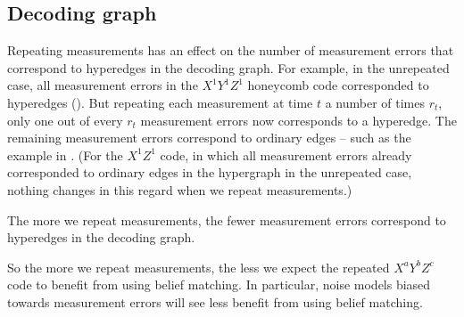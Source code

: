 \subsection{Decoding graph}\label{subsec:repeating_measurements_decoding_graph}

Repeating measurements has an effect on the number of measurement errors that correspond to hyperedges in the decoding graph.
For example, in the unrepeated case, all measurement errors in the $X^1 Y^1 Z^1$ honeycomb code corresponded to hyperedges ().
But repeating each measurement at time $t$ a number of times $r_t$,
only one out of every $r_t$ measurement errors now corresponds to a hyperedge.
The remaining measurement errors correspond to ordinary edges -- such as the example in .
(For the $X^1 Z^1$ code, in which all measurement errors already corresponded to ordinary edges in the hypergraph in the unrepeated case,
nothing changes in this regard when we repeat measurements.)

\begin{difference}\label{dif:repeated_meas_errors_hyperedges}
The more we repeat measurements, the fewer measurement errors correspond to hyperedges in the decoding graph.
\end{difference}

So the more we repeat measurements, the less we expect the repeated $X^a Y^b Z^c$ code to benefit from using belief matching.
In particular, noise models biased towards measurement errors will see less benefit from using belief matching.

